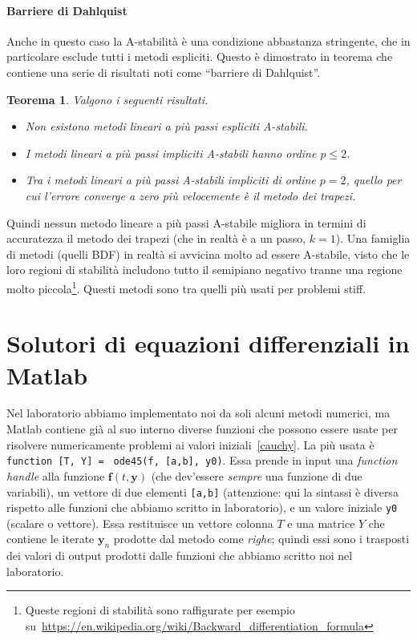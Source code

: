 \documentclass[a4paper]{report}
\newtheorem{theorem}{Teorema}[chapter]
\theoremstyle{definiton}
\theoremstyle{remark}
\newcommand{\y}{\mathbf{y}}
\newcommand{\f}{\mathbf{f}}
\begin{document}
\paragraph{Barriere di Dahlquist} Anche in questo caso la A-stabilità è una condizione abbastanza stringente, che in particolare esclude tutti i metodi espliciti. Questo è dimostrato in teorema che contiene una serie di risultati noti come ``barriere di Dahlquist''.
\begin{theorem} Valgono i seguenti risultati.
\begin{itemize}
    \item Non esistono metodi lineari a più passi \emph{espliciti} A-stabili.
    \item I metodi lineari a più passi \emph{impliciti} A-stabili hanno ordine $p \leq 2$.
    \item Tra i metodi lineari a più passi A-stabili impliciti di ordine $p=2$, quello per cui l'errore converge a zero più velocemente è il metodo dei trapezi.
\end{itemize}
\end{theorem}
Quindi nessun metodo lineare a più passi A-stabile migliora in termini di accuratezza il metodo dei trapezi (che in realtà è a un passo, $k=1$). Una famiglia di metodi (quelli BDF) in realtà si avvicina molto ad essere A-stabile, visto che le loro regioni di stabilità includono tutto il semipiano negativo tranne una regione molto piccola\footnote{Queste regioni di stabilità sono raffigurate per esempio su~\url{https://en.wikipedia.org/wiki/Backward_differentiation_formula}}. Questi metodi sono tra quelli più usati per problemi stiff.

\section{Solutori di equazioni differenziali in Matlab}

Nel laboratorio abbiamo implementato noi da soli alcuni metodi numerici, ma Matlab contiene già al suo interno diverse funzioni che possono essere usate per risolvere numericamente problemi ai valori iniziali~\eqref{cauchy}. La più usata è \lstinline{function [T, Y] = } \lstinline{ode45(f, [a,b], y0)}. Essa prende in input una \emph{function handle} alla funzione $\f(t,\y)$ (che dev'essere \emph{sempre} una funzione di due variabili), un vettore di due elementi \lstinline{[a,b]} (attenzione: qui la sintassi è diversa rispetto alle funzioni che abbiamo scritto in laboratorio), e un valore iniziale \lstinline{y0} (scalare o vettore). Essa restituisce un vettore colonna $T$ e una matrice $Y$ che contiene le iterate $\y_n$ prodotte dal metodo come \emph{righe}; quindi essi sono i trasposti dei valori di output prodotti dalle funzioni che abbiamo scritto noi nel laboratorio.
\end{document}
